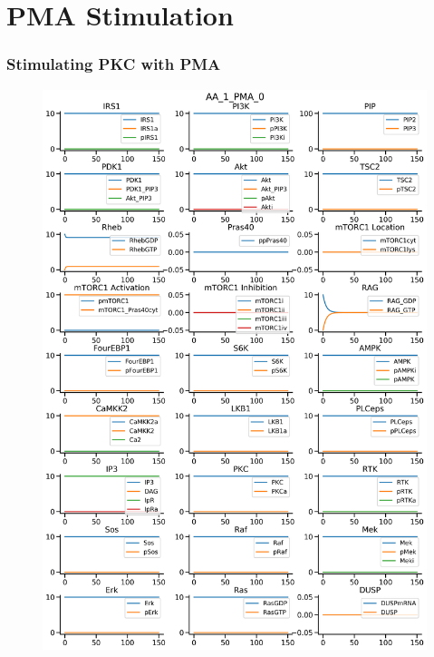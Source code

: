\documentclass{beamer}
\begin{document}
\section{PMA Stimulation}
\begin{frame}
\frametitle{Stimulating PKC with PMA}
\begin{figure}
    \begin{minipage}{0.45\textwidth}
        \centering
        \includegraphics[width=\textwidth]{../simulations/ExtendedPI3KModel/validations/AAWithPMA/AA_1_PMA_0-2.png}
    \end{minipage}
    \begin{minipage}{0.45\textwidth}
        \centering

\end{minipage}
\end{figure}
\end{frame}
\end{document}
